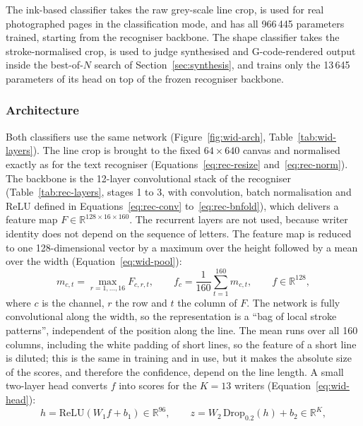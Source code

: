 The ink-based classifier takes the raw grey-scale line crop, is used for real photographed pages in the classification mode, and has all 966\,445 parameters trained, starting from the recogniser backbone.
The shape classifier takes the stroke-normalised crop, is used to judge synthesised and G-code-rendered output inside the best-of-$N$ search of Section~\ref{sec:synthesis}, and trains only the 13\,645 parameters of its head on top of the frozen recogniser backbone.

\subsubsection{Architecture}

Both classifiers use the same network (Figure~\ref{fig:wid-arch}, Table~\ref{tab:wid-layers}).
The line crop is brought to the fixed $64\times640$ canvas and normalised exactly as for the text recogniser (Equations~\ref{eq:rec-resize} and~\ref{eq:rec-norm}).
The backbone is the 12-layer convolutional stack of the recogniser (Table~\ref{tab:rec-layers}, stages 1 to 3, with convolution, batch normalisation and ReLU defined in Equations~\ref{eq:rec-conv} to~\ref{eq:rec-bnfold}), which delivers a feature map $F\in\mathbb R^{128\times16\times160}$.
The recurrent layers are not used, because writer identity does not depend on the sequence of letters.
The feature map is reduced to one 128-dimensional vector by a maximum over the height followed by a mean over the width (Equation~\ref{eq:wid-pool}):
\begin{equation}
m_{c,t}=\max_{r=1,\ldots,16}F_{c,r,t},\qquad f_c=\frac1{160}\sum_{t=1}^{160}m_{c,t},\qquad f\in\mathbb R^{128},
\label{eq:wid-pool}
\end{equation}
where $c$ is the channel, $r$ the row and $t$ the column of $F$.
The network is fully convolutional along the width, so the representation is a ``bag of local stroke patterns'', independent of the position along the line.
The mean runs over all 160 columns, including the white padding of short lines, so the feature of a short line is diluted; this is the same in training and in use, but it makes the absolute size of the scores, and therefore the confidence, depend on the line length.
A small two-layer head converts $f$ into scores for the $K=13$ writers (Equation~\ref{eq:wid-head}):
\begin{equation}
h=\mathrm{ReLU}(W_1f+b_1)\in\mathbb R^{96},\qquad z=W_2\,\mathrm{Drop}_{0.2}(h)+b_2\in\mathbb R^{K},
\label{eq:wid-head}
\end{equation}
